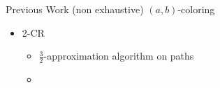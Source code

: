 \begin{frame}{Previous Work (non exhaustive)}
$(a, b)$-coloring

\begin{itemize}


\item
2-CR
\begin{itemize}
\item
$\frac{3}{2}$-approximation algorithm on paths

\item
	
\end{itemize}



\end{itemize}
\end{frame}